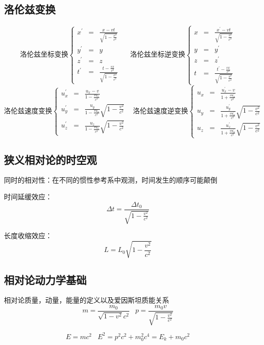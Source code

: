 \documentclass[UTF8]{article}
\begin{document}
\subsection{洛伦兹变换}

\[ \mbox{洛伦兹坐标变换}\left\{
\begin{aligned}
x^{'} & = & \frac{x - vt}{\sqrt{1 - \frac{v^2}{c^2}}} \\
y^{'} & = & y \\
z^{'} & = & z \\
t^{'} & = & \frac{t - \frac{vx}{c^2}}{\sqrt{1 - \frac{v^2}{c^2}}}
\end{aligned}
\right.
\;\;\;\;\;
\mbox{洛伦兹坐标逆变换}\left\{
\begin{aligned}
x & = & \frac{x^{'} - vt}{\sqrt{1 - \frac{v^2}{c^2}}} \\
y & = & y^{'} \\
z & = & z^{'} \\
t & = & \frac{t^{'} - \frac{vx}{c^2}}{\sqrt{1 - \frac{v^2}{c^2}}}
\end{aligned}
\right.
\]
\[ \mbox{洛伦兹速度变换}\left\{
\begin{aligned}
u^{'}_x & = & \frac{u_x - v}{1 - \frac{vu_x}{c^2}} \\
u^{'}_y & = & \frac{u_y}{1 - \frac{vu_x}{c^2}}\sqrt{1 - \frac{v^2}{c^2}} \\
u^{'}_z & = & \frac{u_z}{1 - \frac{vu_x}{c^2}}\sqrt{1 - \frac{v^2}{c^2}}
\end{aligned}
\right.
\;\;\;
\mbox{洛伦兹速度逆变换}\left\{
\begin{aligned}
u_x & = & \frac{u^{'}_x - v}{1 + \frac{vu^{'}_x}{c^2}} \\
u_y & = & \frac{u^{'}_y}{1 + \frac{vu^{'}_x}{c^2}}\sqrt{1 - \frac{v^2}{c^2}} \\
u_z & = & \frac{u^{'}_z}{1 + \frac{vu^{'}_x}{c^2}}\sqrt{1 - \frac{v^2}{c^2}}
\end{aligned}
\right.
\]

\subsection{狭义相对论的时空观}

    同时的相对性：在不同的惯性参考系中观测，时间发生的顺序可能颠倒

    时间延缓效应：
    \[\Delta t = \frac{\Delta t_0}{\sqrt{1 - \frac{v^2}{c^2}}}\]

    长度收缩效应：
    \[L = L_0\sqrt{1 - \frac{v^2}{c^2}}\]

\subsection{相对论动力学基础}

    相对论质量，动量，能量的定义以及爱因斯坦质能关系
    \[m = \frac{m_0}{\sqrt{1 - v^2}c^2}\;\;\;p = \frac{m_0v}{\sqrt{1 - \frac{v^2}{c^2}}}\]

    \[E = mc^2\;\;\;E^2 = p^2c^2 + m_0^2c^4 = E_k + m_0c^2\]
\end{document}
